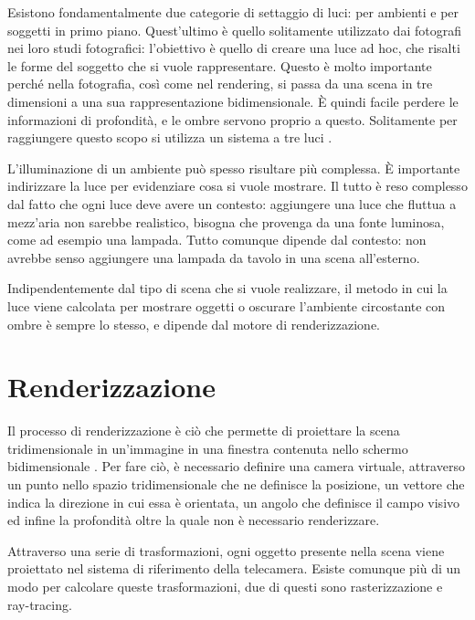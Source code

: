Esistono fondamentalmente due categorie di settaggio di luci: per ambienti e per soggetti in primo piano.
Quest'ultimo è quello solitamente utilizzato dai fotografi nei loro studi fotografici: l'obiettivo è quello di creare una luce ad hoc, che risalti le forme del soggetto che si vuole rappresentare.
Questo è molto importante perché nella fotografia, così come nel rendering, si passa da una scena in tre dimensioni a una sua rappresentazione bidimensionale. 
È quindi facile perdere le informazioni di profondità, e le ombre servono proprio a questo. Solitamente per raggiungere questo scopo si utilizza un sistema a tre luci \cite{3Plight}.

L'illuminazione di un ambiente può spesso risultare più complessa. È importante indirizzare la luce per evidenziare cosa si vuole mostrare.
Il tutto è reso complesso dal fatto che ogni luce deve avere un contesto: aggiungere una luce che fluttua a mezz'aria non sarebbe realistico, bisogna che provenga da una fonte luminosa, come ad esempio una lampada.
Tutto comunque dipende dal contesto: non avrebbe senso aggiungere una lampada da tavolo in una scena all'esterno.

Indipendentemente dal tipo di scena che si vuole realizzare, il metodo in cui la luce viene calcolata per mostrare oggetti o oscurare l'ambiente circostante con ombre è sempre lo stesso, e dipende dal motore di renderizzazione.

\section{Renderizzazione}

Il processo di renderizzazione è ciò che permette di proiettare la scena tridimensionale in un’immagine in una finestra contenuta nello schermo bidimensionale \cite{renderingPipelineDLazzaro}.
Per fare ciò, è necessario definire una camera virtuale, attraverso un punto nello spazio tridimensionale che ne definisce la posizione, un vettore che indica la direzione in cui essa è orientata, un angolo che definisce il campo visivo ed infine la profondità oltre la quale non è necessario renderizzare.

Attraverso una serie di trasformazioni, ogni oggetto presente nella scena viene proiettato nel sistema di riferimento della telecamera.
Esiste comunque più di un modo per calcolare queste trasformazioni, due di questi sono rasterizzazione e ray-tracing.

